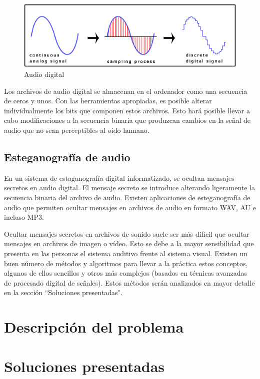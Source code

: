 \documentclass[12pt]{article}
\begin{document}
\begin{figure}[h]
  \centering
    \includegraphics[width=\textwidth]{img/digitalaudio}
  \caption{Audio digital}
  \label{audiodigital}
\end{figure}

Los archivos de audio digital se almacenan en el ordenador como una secuencia de ceros y unos. Con las herramientas apropiadas, es posible alterar individualmente los bits que componen estos archivos. Esto hará posible llevar a cabo modificaciones a la secuencia binaria que produzcan cambios en la señal de audio que no sean perceptibles al oído humano.

\subsection{Esteganografía de audio}

En un sistema de estaganografía digital informatizado, se ocultan mensajes secretos en audio digital. El mensaje secreto se introduce alterando ligeramente la secuencia binaria del archivo de audio. Existen aplicaciones de esteganografía de audio que permiten ocultar mensajes en archivos de audio en formato WAV, AU e incluso MP3.

Ocultar mensajes secretos en archivos de sonido suele ser más difícil que ocultar mensajes en archivos de imagen o vídeo. Esto se debe a la mayor sensibilidad que presenta en las personas el sistema auditivo frente al sistema visual. Existen un buen número de métodos y algoritmos para llevar a la práctica estos conceptos, algunos de ellos sencillos y otros más complejos (basados en técnicas avanzadas de procesado digital de señales). Estos métodos serán analizados en mayor detalle en la sección ``Soluciones presentadas".

\section{Descripción del problema}

\section{Soluciones presentadas}
\end{document}
